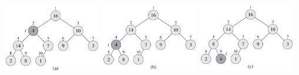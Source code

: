 \documentclass[UTF8,11pt]{beamer}
\begin{document}
\begin{frame}
\begin{center}
	
	\includegraphics[width=0.32\textwidth]{figs/MAX-HEAPIFY(a).PNG}
	\includegraphics[width=0.32\textwidth]{figs/MAX-HEAPIFY(b).PNG}
	\includegraphics[width=0.32\textwidth]{figs/MAX-HEAPIFY(c).PNG}
\end{center}
\end{frame}
\end{document}
